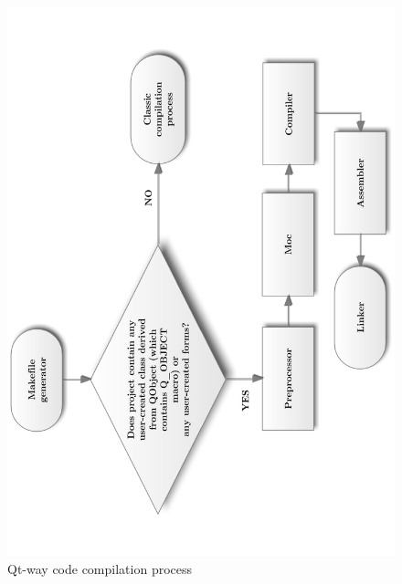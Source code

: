 \begin{figure}[ht]
\centering
\includegraphics[angle=-90,width=14.5cm]{graphics/laboratory/10-qtcomp.pdf}
\caption{Qt-way \cpp code compilation process}\label{figure:qtpr}
\end{figure}
